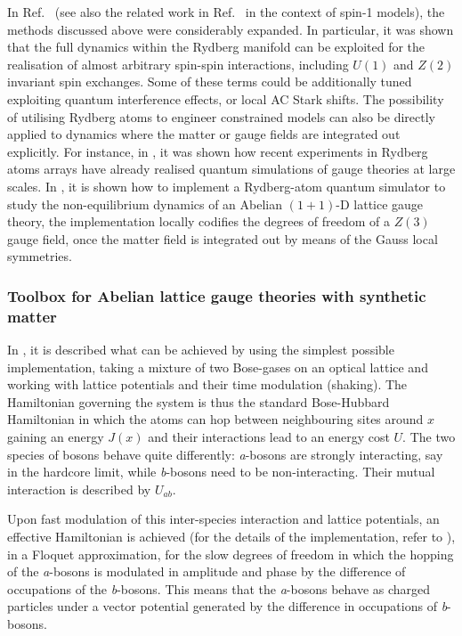 \documentclass[epj,final]{svjour}
\begin{document}
In Ref.~\cite{glaetzle2015designing} (see also the related work in Ref.~\cite{Bijnen:2015aa} in the context of spin-1 models), the methods discussed above were considerably expanded. In particular, it was shown that the full dynamics within the Rydberg manifold can be exploited for the realisation of almost arbitrary spin-spin interactions, including $U(1)$ and $Z(2)$ invariant spin exchanges. Some of these terms could be additionally tuned exploiting quantum interference effects, or local AC Stark shifts. The possibility of utilising Rydberg atoms to engineer constrained models can also be directly applied to dynamics where the matter or gauge fields are integrated out explicitly. For instance, in \cite{surace2019lattice}, it was shown how recent experiments in Rydberg atoms arrays have already realised \cite{51atom} quantum simulations of gauge theories at large scales. In \cite{notarnicola2019real}, it is shown how to implement a Rydberg-atom quantum simulator to study the non-equilibrium dynamics of an Abelian $(1+1)$-D lattice gauge theory, the implementation locally codifies the degrees of freedom of a $Z(3)$ gauge field, once the matter field is integrated out by means of the Gauss local symmetries.

\subsubsection{Toolbox for Abelian lattice gauge theories with synthetic matter\cite{dutta2017toolbox}}

In \cite{dutta2017toolbox}, it is described what can be achieved by using the simplest possible implementation, taking a mixture of two Bose-gases on an optical lattice and working with lattice potentials and their time modulation (shaking). The Hamiltonian governing the system is thus the standard Bose-Hubbard Hamiltonian in which the atoms can hop between neighbouring sites around $x$  gaining an energy $J(x)$ and their interactions lead to an energy cost $U$.  The two species of bosons behave quite differently: {\it a}-bosons are strongly interacting, say in the hardcore limit, while {\it b}-bosons need to be non-interacting. Their mutual interaction is described by $U_{ab}$.

Upon fast modulation of this inter-species interaction and lattice potentials, an effective Hamiltonian is achieved (for the details of the implementation, refer to  \cite{dutta2017toolbox}), in a Floquet approximation, for the slow degrees of freedom in which the hopping of the {\it a}-bosons is modulated in amplitude and phase by the difference of occupations of the {\it b}-bosons. This means that the {\it a}-bosons behave as charged particles under a vector potential generated by the difference in occupations of {\it b}-bosons.
\end{document}
